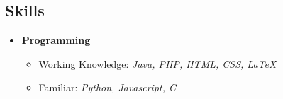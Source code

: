 \documentclass[11pt,letterpaper]{moderncv}
\begin{document}
\subsection{Skills}


\begin{itemize}

\item[]{\textbf{Programming}

	\vspace{-8pt}
	\begin{itemize}
		\item[] Working Knowledge: \textit{Java, PHP, HTML, CSS, \LaTeX}
		\vspace{-6pt}
		\item[] Familiar: \textit{Python, Javascript, C}
	\end{itemize}

}


\end{itemize}
\end{document}
